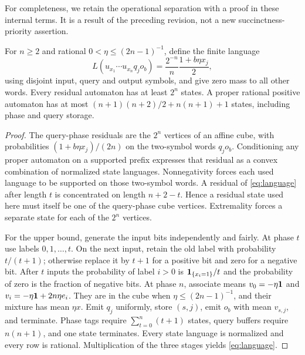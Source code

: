 For completeness, we retain the operational separation with a proof in
these internal terms. It is a result of the preceding revision, not a
new succinctness-priority assertion.

\begin{proposition}
\label{prop:language}
For $n\ge2$ and rational $0<\eta\le(2n-1)^{-1}$, define the finite
language
\begin{equation}\label{eq:language}
 L(u_{x_1}\cdots u_{x_n}q_j o_b)
              =\frac{2^{-n}}n\frac{1+b\eta x_j}{2},
\end{equation}
using disjoint input, query and output symbols, and give zero mass to
all other words. Every residual automaton has at least $2^n$ states.
A proper rational positive automaton has at most
$(n+1)(n+2)/2+n(n+1)+1$ states, including phase and query storage.
\end{proposition}
\begin{proof}
The query-phase residuals are the $2^n$ vertices of an affine cube,
with probabilities $(1+b\eta x_j)/(2n)$ on the two-symbol words
$q_j o_b$. Conditioning any proper automaton on a supported prefix
expresses that residual as a convex combination of normalized state
languages. Nonnegativity forces each used language to be supported on
those two-symbol words. A residual of \eqref{eq:language} after length
$t$ is concentrated on length $n+2-t$. Hence a residual state used here
must itself be one of the query-phase cube vertices. Extremality forces
a separate state for each of the $2^n$ vertices.

For the upper bound, generate the input bits independently and fairly.
At phase $t$ use labels $0,1,\ldots,t$. On the next input, retain the
old label with probability $t/(t+1)$; otherwise replace it by $t+1$
for a positive bit and zero for a negative bit. After $t$ inputs the
probability of label $i>0$ is $\mathbf1_{\{x_i=1\}}/t$ and the probability
of zero is the fraction of negative bits. At phase $n$, associate means
$v_0=-\eta\mathbf1$ and $v_i=-\eta\mathbf1+2n\eta e_i$. They are in the cube
when $\eta\le(2n-1)^{-1}$, and their mixture has mean $\eta x$.
Emit $q_j$ uniformly, store $(s,j)$, emit $o_b$ with mean $v_{s,j}$,
and terminate. Phase tags require $\sum_{t=0}^n(t+1)$ states, query
buffers require $n(n+1)$, and one state terminates. Every state language
is normalized and every row is rational. Multiplication of the three
stages yields \eqref{eq:language}.
\end{proof}
